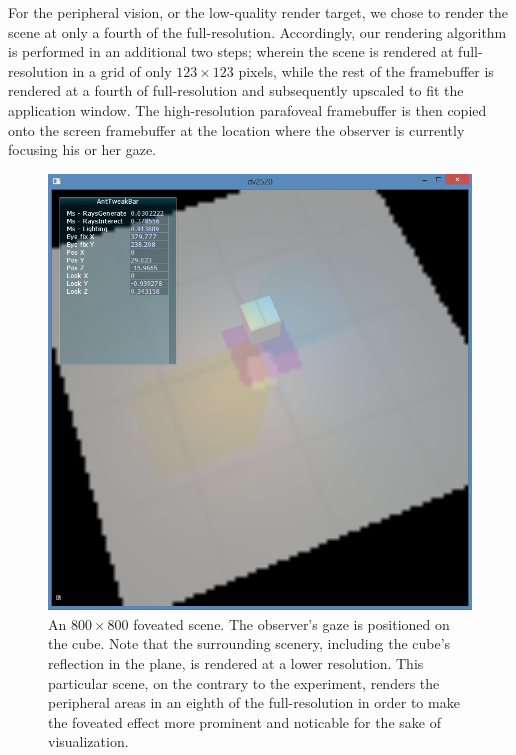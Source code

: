 For the peripheral vision, or the low-quality render target, we chose to render the scene at only a fourth of the full-resolution.
Accordingly, our rendering algorithm is performed in an additional two steps; wherein the scene is rendered at full-resolution in a grid of only $123\times 123$ pixels, while the rest of the framebuffer is rendered at a fourth of full-resolution and subsequently upscaled to fit the application window.
The high-resolution parafoveal framebuffer is then copied onto the screen framebuffer at the location where the observer is currently focusing his or her gaze.

\begin{figure}[p]
  \centering
  \includegraphics[width=1.0\linewidth]{img/fov_rt_et.png}
  \caption{An $800\times 800$ foveated scene. The observer's gaze is positioned on the cube. Note that the surrounding scenery, including the cube's reflection in the plane, is rendered at a lower resolution. This particular scene, on the contrary to the experiment, renders the peripheral areas in an eighth of the full-resolution in order to make the foveated effect more prominent and noticable for the sake of visualization.}
  \label{fig:fov}
\end{figure}
